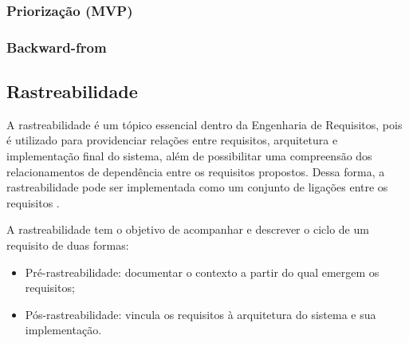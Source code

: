 \subsubsection{Priorização (MVP)}

\subsubsection{Backward-from}

\subsection {Rastreabilidade}
A rastreabilidade é um tópico essencial dentro da Engenharia de Requisitos, pois é utilizado para providenciar relações entre requisitos, arquitetura e implementação final do sistema, além de possibilitar uma compreensão dos relacionamentos de dependência entre os requisitos propostos. Dessa forma, a rastreabilidade pode ser implementada como um conjunto de ligações entre os requisitos \cite{sayao2006rastreabilidade}.

A rastreabilidade tem o objetivo de acompanhar e descrever o ciclo de um requisito de duas formas:
\begin{itemize}
    \item Pré-rastreabilidade: documentar o contexto a partir do qual emergem os requisitos;
    \item Pós-rastreabilidade: vincula os requisitos à arquitetura do sistema e sua implementação.
\end{itemize}